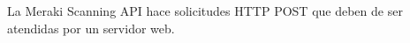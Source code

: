 \begin{frame}
\frametitle{\currentname}
La Meraki Scanning API hace solicitudes HTTP POST que deben de ser atendidas por un servidor web.
\end{frame}
